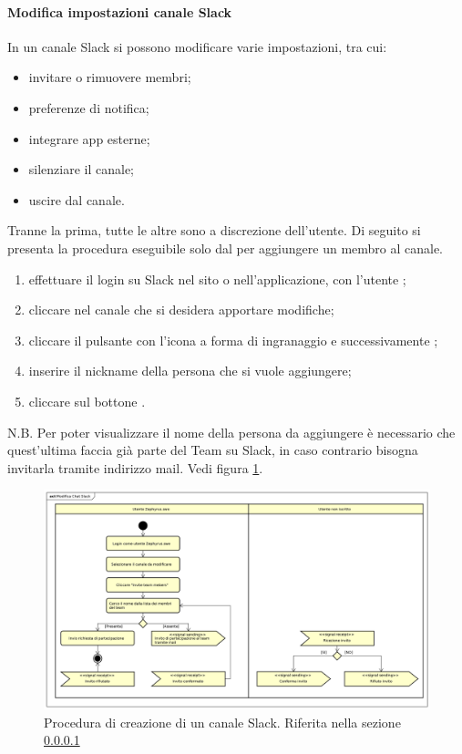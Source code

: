 		\paragraph{Modifica impostazioni canale Slack}\label{sec:ModCanale}
		In un canale Slack si possono modificare varie impostazioni, tra cui: 
		\begin{itemize}
			\item invitare o rimuovere membri;
			\item preferenze di notifica;
			\item integrare app esterne;
			\item silenziare il canale;
			\item uscire dal canale.
		\end{itemize}
		Tranne la prima, tutte le altre sono a discrezione dell'utente. Di seguito si presenta la procedura eseguibile solo dal \responsabile{} per aggiungere un membro al canale. 
		\begin{enumerate}
			\item effettuare il login su Slack nel sito o nell'applicazione, con l'utente ;
			\item cliccare nel canale che si desidera apportare modifiche;
			\item cliccare il pulsante con l'icona a forma di ingranaggio e successivamente ;
			\item inserire il nickname della persona che si vuole aggiungere;
			\item cliccare sul bottone .
		\end{enumerate}
		N.B. Per poter visualizzare il nome della persona da aggiungere è necessario che quest'ultima faccia già parte del Team su Slack, in caso contrario bisogna invitarla tramite indirizzo mail.
		Vedi figura \ref{fig:ProModChannel}.
		\begin{figure}[h!]
			\centering
			\includegraphics[width=\textwidth]{img/ProModChannel}
			\caption{Procedura di creazione di un canale Slack. Riferita nella sezione \ref{sec:ModCanale}}
			\label{fig:ProModChannel}
		\end{figure}\mbox{}\\	
	
